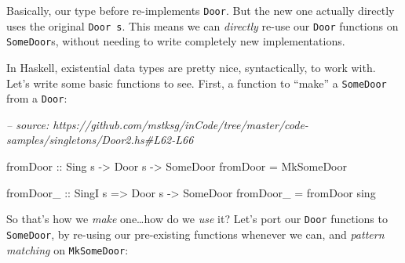 \documentclass[]{article}
\newenvironment{Shaded}{}{}
\newcommand{\CommentTok}[1]{\textcolor[rgb]{0.38,0.63,0.69}{\textit{#1}}}
\newcommand{\DataTypeTok}[1]{\textcolor[rgb]{0.56,0.13,0.00}{#1}}
\newcommand{\KeywordTok}[1]{\textcolor[rgb]{0.00,0.44,0.13}{\textbf{#1}}}
\newcommand{\NormalTok}[1]{#1}
\newcommand{\OperatorTok}[1]{\textcolor[rgb]{0.40,0.40,0.40}{#1}}
\newcommand{\OtherTok}[1]{\textcolor[rgb]{0.00,0.44,0.13}{#1}}
\begin{document}
Basically, our type before re-implements \texttt{Door}. But the new one actually
directly uses the original \texttt{Door\ s}. This means we can \emph{directly}
re-use our \texttt{Door} functions on \texttt{SomeDoor}s, without needing to
write completely new implementations.

In Haskell, existential data types are pretty nice, syntactically, to work with.
Let's write some basic functions to see. First, a function to ``make'' a
\texttt{SomeDoor} from a \texttt{Door}:

\begin{Shaded}
\begin{Highlighting}[]
\CommentTok{-- source: https://github.com/mstksg/inCode/tree/master/code-samples/singletons/Door2.hs#L62-L66}

\OtherTok{fromDoor ::} \DataTypeTok{Sing}\NormalTok{ s }\OtherTok{->} \DataTypeTok{Door}\NormalTok{ s }\OtherTok{->} \DataTypeTok{SomeDoor}
\NormalTok{fromDoor }\OtherTok{=} \DataTypeTok{MkSomeDoor}

\OtherTok{fromDoor_ ::} \DataTypeTok{SingI}\NormalTok{ s }\OtherTok{=>} \DataTypeTok{Door}\NormalTok{ s }\OtherTok{->} \DataTypeTok{SomeDoor}
\NormalTok{fromDoor_ }\OtherTok{=}\NormalTok{ fromDoor sing}
\end{Highlighting}
\end{Shaded}

So that's how we \emph{make} one\ldots how do we \emph{use} it? Let's port our
\texttt{Door} functions to \texttt{SomeDoor}, by re-using our pre-existing
functions whenever we can, and \emph{pattern matching} on \texttt{MkSomeDoor}:

\begin{Shaded}
\end{Shaded}
\end{document}
